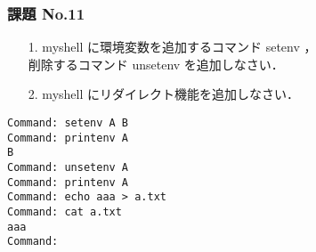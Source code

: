\documentclass{beamer}                 %
\begin{document}
\begin{frame}[fragile]
  \frametitle{課題 No.11}
  \begin{enumerate}
  \item[1.] myshell に環境変数を追加するコマンド setenv ，\\
    削除するコマンド unsetenv を追加しなさい．
  \item[2.] myshell にリダイレクト機能を追加しなさい．
  \end{enumerate}

  \begin{lstlisting}[xleftmargin=5mm]
Command: setenv A B
Command: printenv A
B
Command: unsetenv A
Command: printenv A
Command: echo aaa > a.txt
Command: cat a.txt
aaa
Command:
  \end{lstlisting}
  \vfill
\end{frame}

\end{document}
